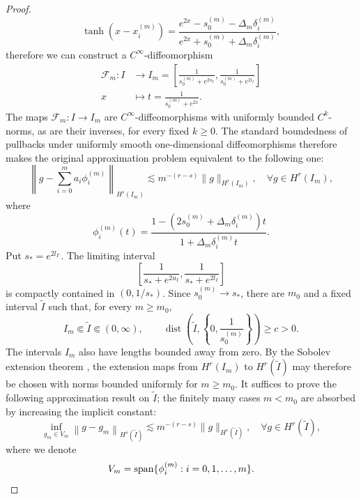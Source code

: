 \documentclass{article}
\numberwithin{equation}{section}
\def\lt{\left}
\def\rt{\right}
\begin{document}
\begin{proof}
    $$\tanh(x-x_i^{(m)}) = \frac{e^{2x}-s_0^{(m)} - \Delta_m\delta_i^{(m)}}{e^{2x}+s_0^{(m)} + \Delta_m\delta_i^{(m)}}, $$
    therefore we can construct a $C^\infty$-diffeomorphism 
    \begin{align*}
        \mathcal{F}_m \colon I &\to I_m = \lt[\frac{1}{s_0^{(m)}+e^{2u_{I}}},\frac{1}{s_0^{(m)}+e^{2l_{I}}} \rt] \\
        x &\mapsto t = \frac{1}{s_0^{(m)}+e^{2x}}.
    \end{align*}
    The maps \(\mathcal F_m:I\to I_m\) are \(C^\infty\)-diffeomorphisms with uniformly bounded \(C^k\)-norms, as are their inverses, for every fixed \(k\geq 0\). The standard boundedness of pullbacks under uniformly smooth one-dimensional diffeomorphisms therefore makes the original approximation problem equivalent to the following one: 
    \begin{equation}
        \lt\|g - \sum_{i=0}^m a_i\phi_i^{(m)}\rt\|_{H^s(I_m)}\lesssim m^{-(r-s)} \|g\|_{H^r(I_m)}, \quad\forall g\in H^r(I_m),
    \end{equation}
    where
    $$\phi_i^{(m)}(t) = \frac{1-(2s_0^{(m)} + \Delta_m\delta_i^{(m)})t}{1+\Delta_m\delta_i^{(m)}t}.$$
    Put $s_\ast=e^{2l_{I'}}$. The limiting interval
    $$
        \lt[\frac{1}{s_\ast+e^{2u_I}},\frac{1}{s_\ast+e^{2l_I}}\rt]
    $$
    is compactly contained in $(0,1/s_\ast)$. Since $s_0^{(m)}\to s_\ast$, there are $m_0$ and a fixed interval $\tilde I$ such that, for every $m\geq m_0$,
    $$
        I_m\Subset\tilde I\Subset(0,\infty),
        \qquad
        \operatorname{dist}\lt(\tilde I,\lt\{0,\frac{1}{s_0^{(m)}}\rt\}\rt)\geq c>0.
    $$
    The intervals $I_m$ also have lengths bounded away from zero. By the Sobolev extension theorem \cite{adams2003sobolev}, the extension maps from $H^r(I_m)$ to $H^r(\tilde I)$ may therefore be chosen with norms bounded uniformly for $m\geq m_0$. It suffices to prove the following approximation result on $\tilde I$; the finitely many cases $m<m_0$ are absorbed by increasing the implicit constant:
    \begin{equation}\label{eqn:equivalent-approx}
        \inf_{g_m\in V_m} \lt\|g - g_m\rt\|_{H^s(\tilde I)}\lesssim m^{-(r-s)} \|g\|_{H^r(\tilde I)}, \quad\forall g\in H^r(\tilde I),
    \end{equation}
    where we denote $$V_m = {\rm span}\{\phi_i^{(m)}:i=0,1,\ldots,m\}.$$ 


\end{proof}
\end{document}
